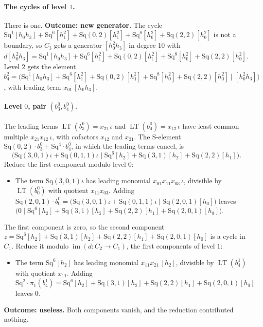 \documentclass[11pt]{article}
\newcommand{\Sq}{\mathrm{Sq}}
\DeclareMathOperator{\LT}{LT}
\begin{document}
\paragraph{The cycles of level $1$.} There is one.
\textbf{Outcome: new generator.} The cycle $\Sq^{1}[h_0h_3] + \Sq^{6}[h_1^2] + \Sq(0,2)[h_1^2] + \Sq^{8}[h_0^2] + \Sq(2,2)[h_0^2]$ is not a boundary, so $C_{3}$ gets a generator $[h_0^2h_3]$ in degree $10$ with $d[h_0^2h_3] = \Sq^{1}[h_0h_3] + \Sq^{6}[h_1^2] + \Sq(0,2)[h_1^2] + \Sq^{8}[h_0^2] + \Sq(2,2)[h_0^2]$.
Level $2$ gets the element $b^{2}_{4} = \bigl(\Sq^{1}[h_0h_3] + \Sq^{6}[h_1^2] + \Sq(0,2)[h_1^2] + \Sq^{8}[h_0^2] + \Sq(2,2)[h_0^2] \;\big|\; [h_0^2h_3]\bigr)$, with leading term $x_{01}\,[h_0h_3]$.
\medskip
\paragraph{Level $0$, pair $(b^{0}_{3}, b^{0}_{4})$.} The leading terms $\LT(b^{0}_{3}) = x_{21}\,\iota$ and $\LT(b^{0}_{4}) = x_{12}\,\iota$ have least common multiple $x_{21}x_{12}\,\iota$, with cofactors $x_{12}$ and $x_{21}$. The S-element $\Sq(0,2)\cdot b^{0}_{3} + \Sq^{4}\cdot b^{0}_{4}$, in which the leading terms cancel, is
\[\bigl(\Sq(3,0,1)\iota + \Sq(0,1,1)\iota \;\big|\; \Sq^{6}[h_2] + \Sq(3,1)[h_2] + \Sq(2,2)[h_1]\bigr).\]
Reduce the first component modulo level $0$:
\begin{itemize}
\item The term $\Sq(3,0,1)\iota$ has leading monomial $x_{01}x_{11}x_{03}\,\iota$, divisible by $\LT(b^{0}_{0})$ with quotient $x_{11}x_{03}$. Adding $\Sq(2,0,1)\cdot b^{0}_{0} = \bigl(\Sq(3,0,1)\iota + \Sq(0,1,1)\iota \;\big|\; \Sq(2,0,1)[h_0]\bigr)$ leaves $\bigl(0 \;\big|\; \Sq^{6}[h_2] + \Sq(3,1)[h_2] + \Sq(2,2)[h_1] + \Sq(2,0,1)[h_0]\bigr)$.
\end{itemize}
The first component is zero, so the second component $z = \Sq^{6}[h_2] + \Sq(3,1)[h_2] + \Sq(2,2)[h_1] + \Sq(2,0,1)[h_0]$ is a cycle in $C_{1}$.
Reduce it modulo $\operatorname{im}(d\colon C_{2}\to C_{1})$, the first components of level $1$:
\begin{itemize}
\item The term $\Sq^{6}[h_2]$ has leading monomial $x_{11}x_{21}\,[h_2]$, divisible by $\LT(b^{1}_{4})$ with quotient $x_{11}$. Adding $\Sq^{2}\cdot \pi_1(b^{1}_{4}) = \Sq^{6}[h_2] + \Sq(3,1)[h_2] + \Sq(2,2)[h_1] + \Sq(2,0,1)[h_0]$ leaves $0$.
\end{itemize}
\textbf{Outcome: useless.} Both components vanish, and the reduction contributed nothing.
\medskip
\end{document}
